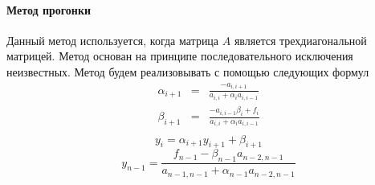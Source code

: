 \paragraph{Метод прогонки}
Данный метод используется, когда матрица $A$ является трехдиагональной матрицей. Метод основан на принципе последовательного исключения неизвестных. Метод будем реализовывать с помощью следующих формул
\begin{equation}
	\begin{array}{rcl}
		\alpha_{i+1}&=&\frac{-a_{i, i+1}}{a_{i, i}+\alpha_i a_{i, i-1}}\\
		\beta_{i+1}&=&\frac{-a_{i, i-1}\beta_i+f_i}{a_{i, i}+\alpha_i a_{i, i-1}}\\
	\end{array}
\end{equation}
\begin{equation}
	y_i=\alpha_{i+1}y_{i+1} + \beta_{i+1}
\end{equation}
\begin{equation}
	y_{n-1}=\frac{f_{n-1} - \beta_{n-1}a_{n-2, n-1}}{a_{n-1, n-1}+\alpha_{n-1}a_{n-2, n-1}}
\end{equation}